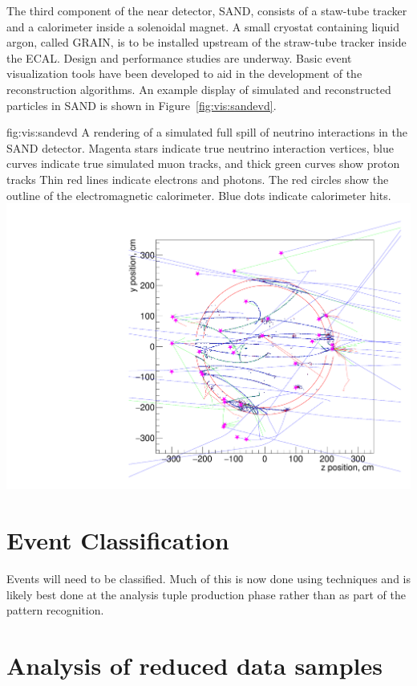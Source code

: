 \documentclass[../main-v1.tex]{subfiles}
\begin{document}
The third component of the near detector, SAND, consists of a staw-tube tracker and a calorimeter inside a solenoidal magnet.  A small cryostat containing liquid argon, called GRAIN, is to be installed upstream of the straw-tube tracker inside the ECAL.  Design and performance studies are underway.  Basic event visualization tools have been developed to aid in the development of the reconstruction algorithms.  An example display of simulated and reconstructed particles in SAND is shown in Figure~\ref{fig:vis:sandevd}.

\begin{dunefigure}
{fig:vis:sandevd} 
{A rendering of a simulated full spill of neutrino interactions in the SAND detector. Magenta stars indicate true neutrino interaction vertices, blue curves indicate true simulated muon tracks, and thick green curves show proton tracks  Thin red lines indicate electrons and photons.  The red circles show the outline of the electromagnetic calorimeter.  Blue dots indicate calorimeter hits.}
\includegraphics[width=0.9 \textwidth]{graphics/EventDisplays/sand_detector_view_stt_17924.pdf}
\end{dunefigure}

\section{Event Classification}
Events will need to be classified.  Much of this is now done using  techniques and is likely best done at the analysis tuple production phase rather than as part of the pattern recognition. 


\section{Analysis of reduced data samples}
\end{document}
